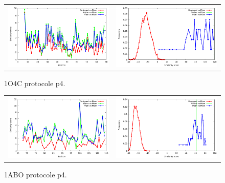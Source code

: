 \documentclass[a4paper,12pt]{article}
\begin{document}
   \begin{figure}[t]
     \centering
     \begin{tabular}{cc}
       \includegraphics[width=8.45cm]{gen_08032012/1O4C/p4/similarity_bypos.pdf} &
       \includegraphics[width=8.45cm]{gen_08032012/1O4C/p4/similarity_byseq_frequency.pdf} \\
     \end{tabular}
     
     \caption{1O4C protocole p4.}
     \label{1ABO}
   \end{figure}
   \begin{figure}[t]
     \centering
     \begin{tabular}{cc}
       \includegraphics[width=8.45cm]{gen_08032012/1ABO/p4/similarity_bypos.pdf} &
       \includegraphics[width=8.45cm]{gen_08032012/1ABO/p4/similarity_byseq_frequency.pdf} \\
     \end{tabular}
     
     \caption{1ABO protocole p4.}
     \label{1ABO}
   \end{figure}
\end{document}
